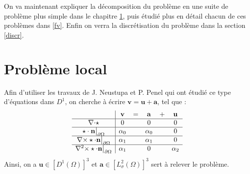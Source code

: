 On va maintenant expliquer la décomposition du problème en une suite de problème plus simple dans le chapitre \ref{local}, puis étudié plus en détail chacun de ces problèmes dans \ref{fv}. Enfin on verra la discrétisation du problème dans la section \ref{discr}.

\section{Problème local}
\label{local}

Afin d'utiliser les travaux de J. Neustupa et P. Penel qui ont étudié ce type d'équations dans $D^1$, on cherche à écrire $\mathbf{v}=\mathbf{u}+\mathbf{a}$, tel que :\\
\begin{equation}
\label{v}
\begin{array}{c|ccccc}
& \mathbf{v} & = & \mathbf{a} & + & \mathbf{u}\\ \hline
{\nabla\cdot}\star & 0 & & 0 & & 0\\ \hline
\star\cdot \mathbf{n}{\big\rvert_{\partial\Omega}} & \alpha_0 & & \alpha_0 & & 0\\ \hline
{\nabla\times}\star\cdot \mathbf{n}{\big\rvert_{\partial\Omega}} & \alpha_1 & & \alpha_1 & & 0\\ \hline
{\nabla^2\times}\star\cdot \mathbf{n}{\big\rvert_{\partial\Omega}} & \alpha_1 & & 0 & & \alpha_2
\end{array}
\end{equation}
Ainsi, on a $\mathbf{u}\in [D^1(\Omega)]^3$ et $\mathbf{a}\in [L_\sigma^2(\Omega)]^3$ sert à relever le problème.

